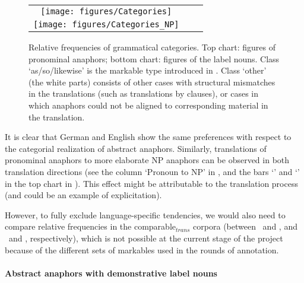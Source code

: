 \documentclass[output=paper]{LSP/langsci}
\begin{document}
\begin{figure}
\begin{center}
\begin{tabular}{ccc}
\texttt{[image: figures/Categories]}  \\
\texttt{[image: figures/Categories\_NP]} 
\end{tabular}
\end{center}
\caption{Relative frequencies of grammatical categories. Top chart: figures of pronominal anaphors; bottom chart: figures of the label nouns. Class `as/so/likewise' is the markable type introduced in \ENt. Class `other' (the white parts) consists of other cases with structural mismatches in the translations (such as translations by clauses), or cases in which  anaphors could not be aligned to corresponding material in the translation.}\label{fig:cat}
\end{figure}

% 

It is clear that German and English show the same preferences with respect to the categorial realization of abstract anaphors. Similarly, translations of pronominal anaphors to more elaborate NP anaphors can be observed in both translation directions (see the column `Pronoun to NP' in , and the bars `\ENt' and `\DEt' in the top chart in ). This effect might be attributable to the translation process (and could be an example of  explicitation).

However, to fully exclude language-specific tendencies, we would also need to compare relative frequencies in the comparable$_{trans}$ corpora (between \DEo\ and \DEt, and \ENo\ and \ENt, respectively), which is not possible at the current stage of the project because of the different sets of markables used in the rounds of annotation.




\paragraph*{Abstract anaphors with demonstrative label nouns}
\end{document}
